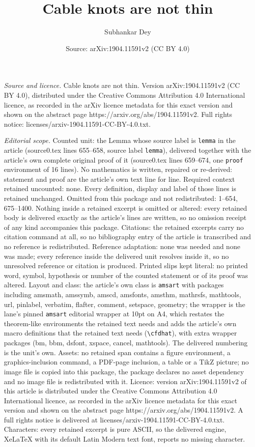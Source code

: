 \documentclass[10pt,a4paper]{amsart}
\title[Cable knots are not thin]{Cable knots are not thin}
\author{Subhankar Dey}
\date{Source: arXiv:1904.11591v2 (CC BY 4.0)}
\begin{document}
\maketitle

\noindent\emph{Source and licence.} Cable knots are not thin. Version arXiv:1904.11591v2 (CC BY 4.0), distributed under the Creative Commons Attribution 4.0 International licence, as recorded in the arXiv licence metadata for this exact version and shown on the abstract page https://arxiv.org/abs/1904.11591v2. Full rights notice: licenses/arxiv-1904.11591-CC-BY-4.0.txt.\par\smallskip

\noindent\textit{Editorial scope.} Counted unit: the Lemma whose source label is \texttt{lemma} in the article (source0.tex lines 655--658, source label \texttt{lemma}), delivered together with the article's own complete original proof of it (source0.tex lines 659--674, one \texttt{proof} environment of 16 lines). No mathematics is written, repaired or re-derived: statement and proof are the article's own text line for line. Required context retained uncounted: none. Every definition, display and label of those lines is retained unchanged. Omitted from this package and not redistributed: 1--654, 675--1400. Nothing inside a retained excerpt is omitted or altered: every retained body is delivered exactly as the article's lines are written, so no omission receipt of any kind accompanies this package. Citations: the retained excerpts carry no citation command at all, so no bibliography entry of the article is transcribed and no reference is redistributed. Reference adaptation: none was needed and none was made; every reference inside the delivered unit resolves inside it, so no unresolved reference or citation is produced. Printed slips kept literal: no printed word, symbol, hypothesis or number of the counted statement or of its proof was altered. Layout and class: the article's own class is \texttt{amsart} with packages including amsmath, amssymb, amscd, amsfonts, amsthm, mathrsfs, mathtools, url, pinlabel, verbatim, flafter, comment, setspace, geometry; the wrapper is the lane's pinned \texttt{amsart} editorial wrapper at 10pt on A4, which restates the theorem-like environments the retained text needs and adds the article's own macro definitions that the retained text needs (\texttt{\textbackslash cfdhat}), with extra wrapper packages (bm, bbm, dsfont, xspace, cancel, mathtools). The delivered numbering is the unit's own. Assets: no retained span contains a figure environment, a graphics-inclusion command, a PDF-page inclusion, a table or a TikZ picture; no image file is copied into this package, the package declares no asset dependency and no image file is redistributed with it. Licence: version arXiv:1904.11591v2 of this article is distributed under the Creative Commons Attribution 4.0 International licence, as recorded in the arXiv licence metadata for this exact version and shown on the abstract page https://arxiv.org/abs/1904.11591v2. A full rights notice is delivered at licenses/arxiv-1904.11591-CC-BY-4.0.txt. Characters: every retained excerpt is pure ASCII, so the delivered engine, XeLaTeX with its default Latin Modern text font, reports no missing character.
\end{document}
